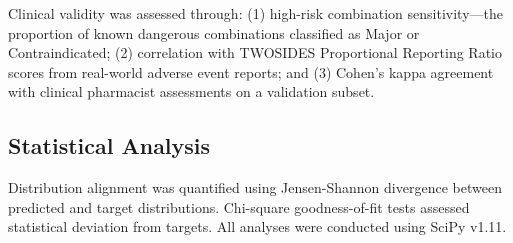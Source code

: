 \documentclass[11pt,a4paper]{article}
\begin{document}
Clinical validity was assessed through: (1) high-risk combination sensitivity---the proportion of known dangerous combinations classified as Major or Contraindicated; (2) correlation with TWOSIDES Proportional Reporting Ratio scores from real-world adverse event reports; and (3) Cohen's kappa agreement with clinical pharmacist assessments on a validation subset.

\subsection*{Statistical Analysis}

Distribution alignment was quantified using Jensen-Shannon divergence between predicted and target distributions. Chi-square goodness-of-fit tests assessed statistical deviation from targets. All analyses were conducted using SciPy v1.11.
\end{document}
